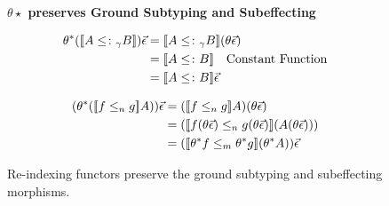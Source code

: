     \begin{figure}
        \begin{framed}
            \centering\textbf{$\theta\star$ preserves Ground Subtyping and Subeffecting}
    
            \begin{minipage}{.45\textwidth}
                \begin{align*}
                    \theta\star(\deno{A\subtypeg B})\ev  & = \deno{A\subtypeg B}(\theta\ev)\\
                    & = \deno{A\subtype B} \qt{Constant Function}\\
                    & = \deno{A\subtype B} \ev\\
                \end{align*}
            \end{minipage}
            \quad
            \begin{minipage}{.45\textwidth}
                \begin{align*}
                    (\theta\star(\dsen{f}{g} A))\ev & = (\dsen{f}{g} A)(\theta \ev)\\
                    & = (\dsen{f(\theta\ev)}{g(\theta\ev)}(A(\theta\ev)))\\
                    & = (\dsem{\theta\star f}{\theta\star g} (\theta\star A)) \ev\\
                \end{align*}
            \end{minipage}
        \end{framed}
        \caption{Re-indexing functors preserve the ground subtyping and subeffecting morphisms.}
        \label{PreservesSubtypingSubeffecting}
    \end{figure}
